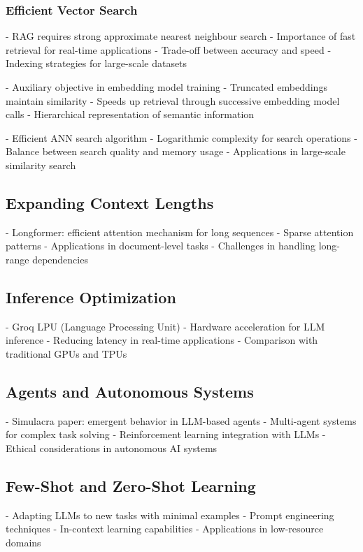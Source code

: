 \documentclass[a4paper, oneside]{discothesis}
\begin{document}
\subsubsection{Efficient Vector Search}
- RAG requires strong approximate nearest neighbour search
- Importance of fast retrieval for real-time applications
- Trade-off between accuracy and speed
- Indexing strategies for large-scale datasets

- Auxiliary objective in embedding model training
- Truncated embeddings maintain similarity
- Speeds up retrieval through successive embedding model calls
- Hierarchical representation of semantic information

- Efficient ANN search algorithm
- Logarithmic complexity for search operations
- Balance between search quality and memory usage
- Applications in large-scale similarity search

\subsection{Expanding Context Lengths}
- Longformer: efficient attention mechanism for long sequences
- Sparse attention patterns
- Applications in document-level tasks
- Challenges in handling long-range dependencies

\subsection{Inference Optimization}
- Groq LPU (Language Processing Unit)
- Hardware acceleration for LLM inference
- Reducing latency in real-time applications
- Comparison with traditional GPUs and TPUs

\subsection{Agents and Autonomous Systems}
- Simulacra paper: emergent behavior in LLM-based agents
- Multi-agent systems for complex task solving
- Reinforcement learning integration with LLMs
- Ethical considerations in autonomous AI systems

\subsection{Few-Shot and Zero-Shot Learning}
- Adapting LLMs to new tasks with minimal examples
- Prompt engineering techniques
- In-context learning capabilities
- Applications in low-resource domains
\end{document}
